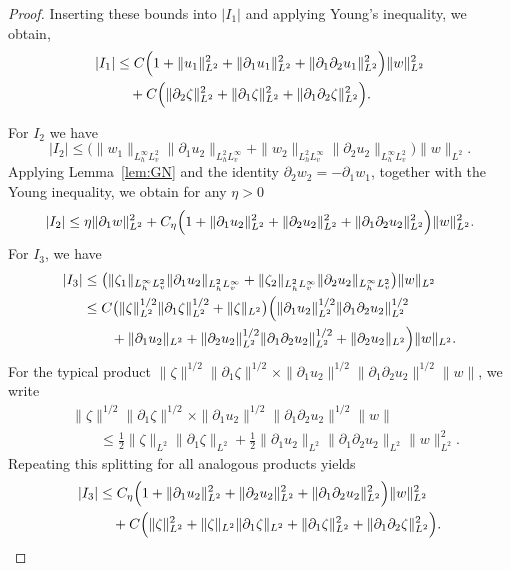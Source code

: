 \documentclass[11pt,a4paper,reqno]{amsart}
\theoremstyle{definition}
\begin{document}
\begin{proof}
Inserting these bounds into $|I_1|$ and applying Young's inequality, we obtain,
\begin{align}\label{est_I1}
  |I_1| &\le C \Bigl(1+\| u_1\|_{L^2}^2+\|\partial_1 u_1\|_{L^2}^2
          +\|\partial_1\partial_2 u_1\|_{L^2}^2\Bigr) \|w\|_{L^2}^2 \notag\\
  &\quad + C\Bigl(\|\partial_2\zeta\|_{L^2}^2
          + \|\partial_1\zeta\|_{L^2}^2 + \|\partial_1\partial_2\zeta\|_{L^2}^2\Bigr).
\end{align}


  For $I_2$ we have
  \[
    |I_2| \le \bigl(\|w_1\|_{L^\infty_h L^2_v}\|\partial_1 u_2\|_{L^2_h L^\infty_v}
          + \|w_2\|_{L^2_h L^\infty_v}\|\partial_2 u_2\|_{L^\infty_h L^2_v}\bigr) \|w\|_{L^2}.
  \]
  Applying Lemma~\ref{lem:GN} and the identity $\partial_2 w_2=-\partial_1 w_1$,
  together with the Young inequality, we obtain for any $\eta>0$
  \begin{equation}\label{est_I2}
    |I_2| \le \eta \|\partial_1 w\|_{L^2}^2
      + C_\eta \Bigl(1+\|\partial_1 u_2\|_{L^2}^2+\|\partial_2 u_2\|_{L^2}^2
        +\|\partial_1\partial_2 u_2\|_{L^2}^2\Bigr) \|w\|_{L^2}^2 .
  \end{equation}
  For $I_3$, we have
  \begin{align*}
    |I_3| &\le \bigl(\|\zeta_1\|_{L^\infty_h L^2_v}\|\partial_1 u_2\|_{L^2_h L^\infty_v}
          + \|\zeta_2\|_{L^2_h L^\infty_v}\|\partial_2 u_2\|_{L^\infty_h L^2_v}\bigr)
          \|w\|_{L^2} \\
    &\le C\bigl(\|\zeta\|_{L^2}^{1/2}\|\partial_1\zeta\|_{L^2}^{1/2}+\|\zeta\|_{L^2}\bigr)
      \Bigl(\|\partial_1 u_2\|_{L^2}^{1/2}\|\partial_1\partial_2 u_2\|_{L^2}^{1/2}\\
      &\qquad+\|\partial_1 u_2\|_{L^2}+\|\partial_2 u_2\|_{L^2}^{1/2}\|\partial_1\partial_2 u_2\|_{L^2}^{1/2}
          +\|\partial_2 u_2\|_{L^2}\Bigr) \|w\|_{L^2}.
  \end{align*}
   For the typical product
  $\|\zeta\|^{1/2}\|\partial_1\zeta\|^{1/2}
   \times \|\partial_1 u_2\|^{1/2}\|\partial_1\partial_2 u_2\|^{1/2} \|w\|$,
  we write
  \begin{align*}
   &\|\zeta\|^{1/2}\|\partial_1\zeta\|^{1/2}
   \times \|\partial_1 u_2\|^{1/2}\|\partial_1\partial_2 u_2\|^{1/2} \|w\|\\
   &\qquad \le \tfrac12 \|\zeta\|_{L^2}\|\partial_1\zeta\|_{L^2}
    + \tfrac12 \|\partial_1 u_2\|_{L^2}\|\partial_1\partial_2 u_2\|_{L^2} \|w\|_{L^2}^2 .
  \end{align*}
  Repeating this splitting for all analogous products yields
  \begin{align}\label{est_I3}
    |I_3| &\le C_\eta \Bigl(1+\|\partial_1 u_2\|_{L^2}^2+\|\partial_2 u_2\|_{L^2}^2
        +\|\partial_1\partial_2 u_2\|_{L^2}^2\Bigr) \|w\|_{L^2}^2 \notag\\
    &\quad + C\Bigl(\|\zeta\|_{L^2}^2 + \|\zeta\|_{L^2}\|\partial_1\zeta\|_{L^2}
        + \|\partial_1\zeta\|_{L^2}^2 + \|\partial_1\partial_2\zeta\|_{L^2}^2\Bigr).
  \end{align}







\end{proof}
\end{document}
